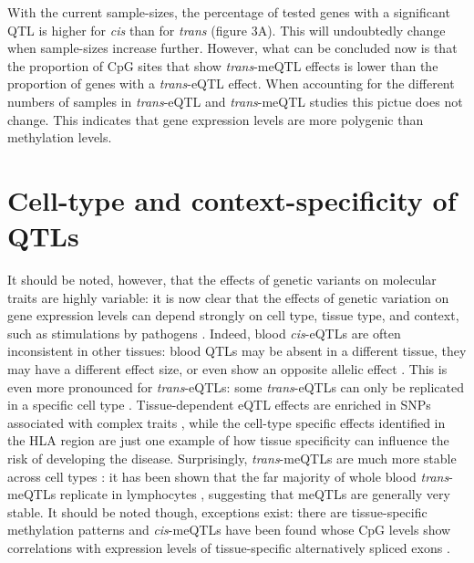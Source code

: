 With the current sample-sizes, the percentage of tested genes with a significant QTL is higher for \emph{cis} than for \emph{trans} (figure 3A). This will undoubtedly change when sample-sizes increase further. However, what can be concluded now is that the proportion of CpG sites that show \emph{trans}-meQTL effects is lower than the proportion of genes with a \emph{trans}-eQTL effect. When accounting for the different numbers of samples in \emph{trans}-eQTL and \emph{trans}-meQTL studies this pictue does not change. This indicates that gene expression levels are more polygenic than methylation levels. 

\section{Cell-type and context-specificity of QTLs}
It should be noted, however, that the effects of genetic variants on molecular traits are highly variable: it is now clear that the effects of genetic variation on gene expression levels can depend strongly on cell type, tissue type, and context, such as stimulations by pathogens \cite{fuUnravelingRegulatoryMechanisms2012,gat-viksDecipheringMolecularCircuits2013,fairfaxInnateImmuneActivity2014,leeCommonGeneticVariants2014,meleHumanTranscriptomeTissues2015}. Indeed, blood \emph{cis}-eQTLs are often inconsistent in other tissues: blood QTLs may be absent in a different tissue, they may have a different effect size, or even show an opposite allelic effect \cite{fuUnravelingRegulatoryMechanisms2012}. This is even more pronounced for \emph{trans}-eQTLs: some \emph{trans}-eQTLs can only be replicated in a specific cell type \cite{westraSystematicIdentificationTrans2013}. Tissue-dependent eQTL effects are enriched in SNPs associated with complex traits \cite{fuUnravelingRegulatoryMechanisms2012}, while the cell-type specific effects identified in the HLA region \cite{fairfaxGeneticsGeneExpression2012} are just one example of how tissue specificity can influence the risk of developing the disease. Surprisingly, \emph{trans}-meQTLs are much more stable across cell types \cite{gutierrez-arcelusTissueSpecificEffectsGenetic2015}: it has been shown that the far majority of whole blood \emph{trans}-meQTLs replicate in lymphocytes \cite{bonderDiseaseVariantsAlter2017}, suggesting that meQTLs are generally very stable. It should be noted though, exceptions exist: there are tissue-specific methylation patterns \cite{lokkDNAMethylomeProfiling2014} and \emph{cis}-meQTLs have been found whose CpG levels show correlations with expression levels of tissue-specific alternatively spliced exons \cite{gutierrez-arcelusTissueSpecificEffectsGenetic2015}.

